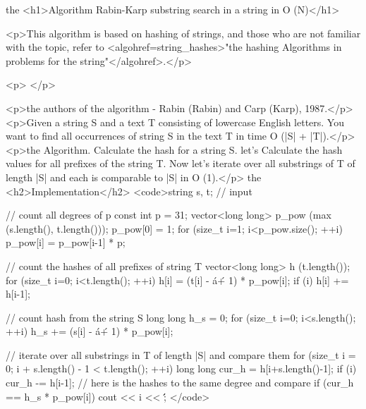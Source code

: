 the <h1>Algorithm Rabin-Karp substring search in a string in O (N)</h1>

<p>This algorithm is based on hashing of strings, and those who are not familiar with the topic, refer to <algohref=string_hashes>"the hashing Algorithms in problems for the string"</algohref>.</p>

<p> </p>

<p>the authors of the algorithm - Rabin (Rabin) and Carp (Karp), 1987.</p>
<p>Given a string S and a text T consisting of lowercase English letters. You want to find all occurrences of string S in the text T in time O (|S| + |T|).</p>
<p>the Algorithm. Calculate the hash for a string S. let's Calculate the hash values for all prefixes of the string T. Now let's iterate over all substrings of T of length |S| and each is comparable to |S| in O (1).</p>
the <h2>Implementation</h2>
<code>string s, t; // input

// count all degrees of p
const int p = 31;
vector<long long> p_pow (max (s.length(), t.length()));
p_pow[0] = 1;
for (size_t i=1; i<p_pow.size(); ++i)
p_pow[i] = p_pow[i-1] * p;

// count the hashes of all prefixes of string T
vector<long long> h (t.length());
for (size_t i=0; i<t.length(); ++i)
{
h[i] = (t[i] - \'a\' + 1) * p_pow[i];
if (i) h[i] += h[i-1];
}

// count hash from the string S
long long h_s = 0;
for (size_t i=0; i<s.length(); ++i)
h_s += (s[i] - \'a\' + 1) * p_pow[i];

// iterate over all substrings in T of length |S| and compare them
for (size_t i = 0; i + s.length() - 1 < t.length(); ++i)
{
long long cur_h = h[i+s.length()-1];
if (i) cur_h -= h[i-1];
// here is the hashes to the same degree and compare
if (cur_h == h_s * p_pow[i])
cout << i << \' \';
}</code>